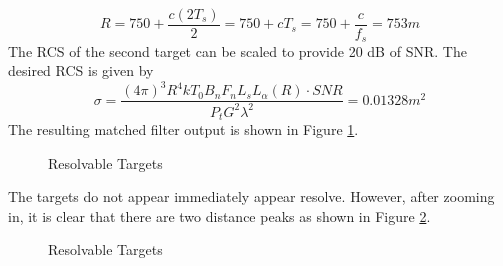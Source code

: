 \documentclass[12pt,letterpaper]{article}
\begin{document}
\begin{equation}
R = 750 + \frac{c(2T_s)}{2} = 750 + cT_s = 750 + \frac{c}{f_s} = 753 m
\end{equation}
The RCS of the second target can be scaled to provide 20 dB of SNR. The desired RCS is given by
\begin{equation}
\sigma = \frac{(4\pi)^3 R^4 k T_0 B_n F_n L_s L_\alpha(R)\cdot SNR}{P_t G^2 \lambda^2} = 0.01328  m^2
\end{equation}
The resulting matched filter output is shown in Figure \ref{Resolvable Full}.
\begin{figure}[H]
\caption{Resolvable Targets}
\label{Resolvable Full}
\end{figure}
The targets do not appear immediately appear resolve. However, after zooming in, it is clear that there are two distance peaks as shown in Figure \ref{Resolvable Peak}.
\begin{figure}[H]
\caption{Resolvable Targets}
\label{Resolvable Peak}
\end{figure}
\end{document}
